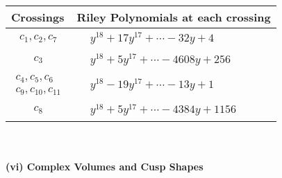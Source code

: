 \documentclass[1p]{elsarticle_modified}
\theoremstyle{definition}
\begin{document}
\begin{tabular}{m{50pt}|m{274pt}}
Crossings & \hspace{64pt}Riley Polynomials at each crossing \\
\hline $$\begin{aligned}c_{1},c_{2},c_{7}\end{aligned}$$&$\begin{aligned}
&y^{18}+17 y^{17}+\cdots-32 y+4
\end{aligned}$\\
\hline $$\begin{aligned}c_{3}\end{aligned}$$&$\begin{aligned}
&y^{18}+5 y^{17}+\cdots-4608 y+256
\end{aligned}$\\
\hline $$\begin{aligned}c_{4},c_{5},c_{6}\\c_{9},c_{10},c_{11}\end{aligned}$$&$\begin{aligned}
&y^{18}-19 y^{17}+\cdots-13 y+1
\end{aligned}$\\
\hline $$\begin{aligned}c_{8}\end{aligned}$$&$\begin{aligned}
&y^{18}+5 y^{17}+\cdots-4384 y+1156
\end{aligned}$\\
\hline
\end{tabular}\\~\\
\newpage\flushleft \textbf{(vi) Complex Volumes and Cusp Shapes}
\end{document}
